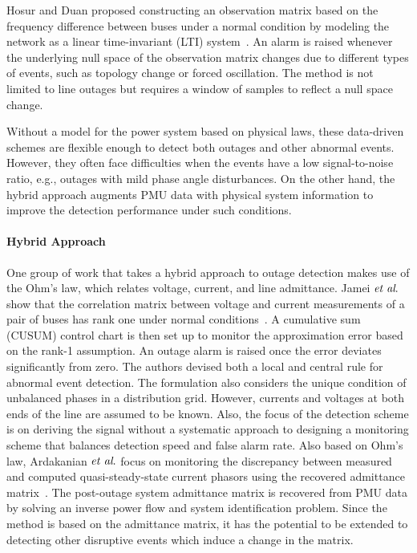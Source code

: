 Hosur and Duan proposed constructing an observation matrix based on the frequency difference between buses under a normal condition by modeling the network as a linear time-invariant (LTI) system~\cite{Hosur2019}. An alarm is raised whenever the underlying null space of the observation matrix changes due to different types of events, such as topology change or forced oscillation. The method is not limited to line outages but requires a window of samples to reflect a null space change. 

Without a model for the power system based on physical laws, these data-driven schemes are flexible enough to detect both outages and other abnormal events. However, they often face difficulties when the events have a low signal-to-noise ratio, e.g., outages with mild phase angle disturbances. On the other hand, the hybrid approach augments PMU data with physical system information to improve the detection performance under such conditions.

\paragraph{Hybrid Approach}
One group of work that takes a hybrid approach to outage detection makes use of the Ohm’s law, which relates voltage, current, and line admittance. Jamei $\textit{et al}.$ show that the correlation matrix between voltage and current measurements of a pair of buses has rank one under normal conditions~\cite{Jamei2016,Jamei2017a}. A cumulative sum (CUSUM) control chart is then set up to monitor the approximation error based on the rank-1 assumption. An outage alarm is raised once the error deviates significantly from zero. The authors devised both a local and central rule for abnormal event detection. The formulation also considers the unique condition of unbalanced phases in a distribution grid. However, currents and voltages at both ends of the line are assumed to be known. Also, the focus of the detection scheme is on deriving the signal without a systematic approach to designing a monitoring scheme that balances detection speed and false alarm rate. 
Also based on Ohm’s law, Ardakanian $\textit{et al}.$ focus on monitoring the discrepancy between measured and computed quasi-steady-state current phasors using the recovered admittance matrix~\cite{ardakanian2017event,Ardakanian2019a}. The post-outage system admittance matrix is recovered from PMU data by solving an inverse power flow and system identification problem. Since the method is based on the admittance matrix, it has the potential to be extended to detecting other disruptive events which induce a change in the matrix.

